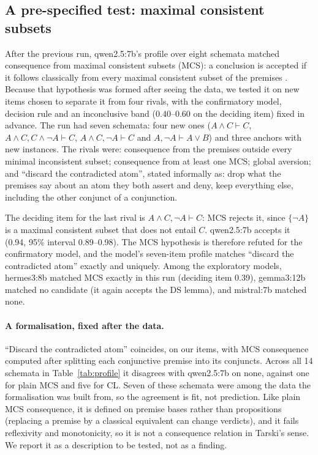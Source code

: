 \documentclass[11pt]{article}
\begin{document}
\subsection{A pre-specified test: maximal consistent subsets}\label{sec:mcs}
After the previous run, qwen2.5:7b's profile over eight schemata matched consequence from maximal
consistent subsets (MCS): a conclusion is accepted if it follows classically from every maximal
consistent subset of the premises \citep{rescher1970}. Because that hypothesis was formed after seeing
the data, we tested it on new items chosen to separate it from four rivals, with the confirmatory model,
decision rule and an inconclusive band (0.40--0.60 on the deciding item) fixed in advance. The run
had seven schemata: four new ones ($A \land C \vdash C$, $A \land C, C \land \neg A \vdash C$,
$A \land C, \neg A \vdash C$ and $A, \neg A \vdash A \lor B$) and three anchors with new instances. The rivals were: consequence from the premises outside every minimal
inconsistent subset; consequence from at least one MCS; global aversion; and ``discard the contradicted
atom'', stated informally as: drop what the premises say about an atom they both assert and deny, keep
everything else, including the other conjunct of a conjunction.

The deciding item for the last rival is $A \land C, \neg A \vdash C$: MCS rejects it, since $\{\neg A\}$
is a maximal consistent subset that does not entail $C$. qwen2.5:7b accepts it (0.94, 95\% interval
0.89--0.98). The MCS hypothesis is therefore refuted for the confirmatory model, and the model's
seven-item profile matches ``discard the contradicted atom'' exactly and uniquely. Among the exploratory
models, hermes3:8b matched MCS exactly in this run (deciding item 0.39), gemma3:12b matched no candidate
(it again accepts the DS lemma), and mistral:7b matched none.

\paragraph{A formalisation, fixed after the data.}
``Discard the contradicted atom'' coincides, on our items, with MCS consequence computed after splitting
each conjunctive premise into its conjuncts. Across all 14 schemata in Table~\ref{tab:profile} it
disagrees with qwen2.5:7b on none, against one for plain MCS and five for CL. Seven of these schemata were among the data the formalisation was built
from, so the agreement is fit, not prediction. Like plain MCS consequence, it is defined on premise bases
rather than propositions (replacing a premise by a classical equivalent can change verdicts), and it
fails reflexivity and monotonicity, so it is not a consequence relation in Tarski's sense. We report it as
a description to be tested, not as a finding.
\end{document}
